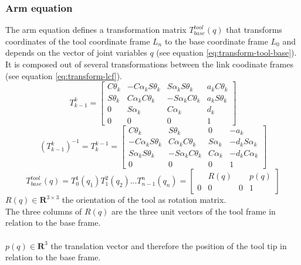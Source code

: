 \documentclass{article}
\begin{document}
	\subsubsection{Arm equation}
	The arm equation defines a transformation matrix $T^{tool}_{base}(q)$ that transforms coordinates of the tool coordinate frame $L_n$ to the base coordinate frame $L_0$ and depends on the vector of joint variables $q$ (see equation \ref{eq:transform-tool-base}). It is composed out of several transformations between the link coodinate frames (see equation \ref{eq:transform-lcf}).
	\begin{equation}
	T^{k}_{k-1} = 
	\begin{bmatrix}
	C \theta_k & -C \alpha_k S \theta_k & S \alpha_k S \theta_k & a_k C \theta_k\\
	S \theta_k & C \alpha_k C \theta_k & -S \alpha_k C \theta_k & a_k S \theta_k\\
	0 & S \alpha_k & C \alpha_k & d_k\\
	0 & 0 & 0 & 1
	\end{bmatrix}
	\label{eq:transform-lcf}
	\end{equation}
	\begin{equation}
	(T^{k}_{k-1})^{-1} = T^{k-1}_{k} = 
	\begin{bmatrix}
	C \theta_k & S \theta_k & 0 & -a_k\\
	-C \alpha_k S \theta_k & C \alpha_k C \theta_k & S \alpha_k & -d_k S \alpha_k\\
	S \alpha_k S \theta_k & -S \alpha_k C \theta_k & C \alpha_k & -d_k C \alpha_k\\
	0 & 0 & 0 & 1
	\end{bmatrix}
	\end{equation}
	\begin{equation}
	T^{tool}_{base}(q) = T^1_0(q_1) T^2_1(q_2) ... T^n_{n-1}(q_n) = 
	\begin{bmatrix}
	& R(q) & & p(q)\\
	0 & 0 & 0 & 1
	\end{bmatrix}
	\label{eq:transform-tool-base}
	\end{equation}
	$R(q) \in \mathbf{R}^{3 \times 3}$ the orientation of the tool as rotation matrix.\\
	The three columns of $R(q)$ are the three unit vectors of the tool frame in relation to the base frame.\\
	\\
	$p(q) \in \mathbf{R}^3$ the translation vector and therefore the position of the tool tip in relation to the base frame.
	
\end{document}
